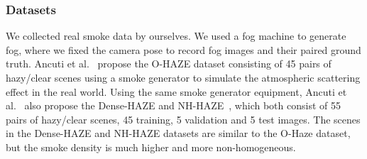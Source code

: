 \documentclass[runningheads]{llncs}
\begin{document}
\begin{table}[t!]
	\centering
	\caption{Quantitative results on Dense-HAZE, NH-HAZE, O-HAZE and self-collected smoke datasets.}
	\label{tab:comparisons}
\end{table}

\subsubsection{Datasets}
We collected real smoke data by ourselves. We used a fog machine to generate fog, where we fixed the camera pose to record fog images and their paired ground truth.
Ancuti et al.~\cite{ancuti2018haze} propose the O-HAZE dataset consisting of 45 pairs of hazy/clear scenes using a smoke generator to simulate the atmospheric scattering effect in the real world. 
Using the same smoke generator equipment, Ancuti et al.~\cite{ancuti2019dense} also propose the Dense-HAZE and NH-HAZE~\cite{ancuti2020nh,ancuti2020ntire}, which both consist of 55 pairs of hazy/clear scenes, 45 training, 5 validation and 5 test images.
The scenes in the Dense-HAZE and NH-HAZE datasets are similar to the O-Haze dataset, but the smoke density is much higher and more non-homogeneous.
\end{document}
